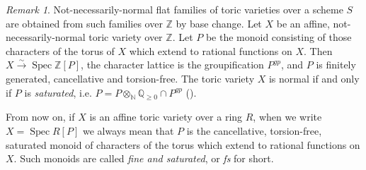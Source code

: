 \documentclass[a4paper,11pt]{amsart} %
\numberwithin{equation}{subsection}
\newcommand{\on}[1]{\operatorname{#1}}
\newcommand{\bb}[1]{{\mathbb{#1}}}
\newcommand{\lra}{\longrightarrow}
\newcommand{\iso}{\stackrel{\sim}{\lra}}
\theoremstyle{definition}
\theoremstyle{plain}%
\theoremstyle{remark}
\newtheorem{remark}[definition]{Remark}
\begin{document}
\begin{remark}\label{remark:monoids_of_TVs_are_integral_saturated}
    Not-necessarily-normal flat families of toric varieties over a scheme $S$ are obtained from such families over $\bb Z$ by base change. Let $X$ be an affine, not-necessarily-normal toric variety over $\bb Z$. Let $P$ be the monoid consisting of those characters of the torus of $X$ which extend to rational functions on $X$. Then $X \iso \on{Spec} \bb Z[P]$, the character lattice is the groupification $P^{gp}$, and $P$ is finitely generated, cancellative and torsion-free. The toric variety $X$ is normal if and only if $P$ is \emph{saturated}, i.e. $P=P\otimes_{\bb N} \bb Q_{\geq 0} \cap P^{gp}$ (\cite[Theorem 1.3.5]{cox2011toric}).
\end{remark}

From now on, if $X$ is an affine toric variety over a ring $R$, when we write $X=\on{Spec}R[P]$ we always mean that $P$ is the cancellative, torsion-free, saturated monoid of characters of the torus which extend to rational functions on $X$. Such monoids are called \emph{fine and saturated}, or \emph{fs} for short.
\end{document}
